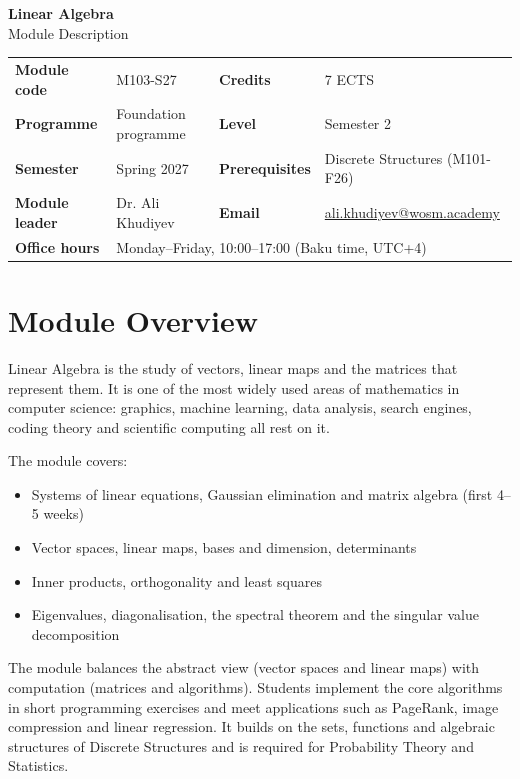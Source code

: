 \documentclass[11pt,a4paper]{article}
\makeatletter
\newcommand{\ModuleTitle}{Linear Algebra}
\newcommand{\ModuleCode}{M103-S27}
\newcommand{\Programme}{Foundation programme}
\newcommand{\Level}{Semester 2}
\newcommand{\Semester}{Spring 2027}
\newcommand{\Credits}{7 ECTS}
\newcommand{\ModuleLeader}{Dr. Ali Khudiyev}
\newcommand{\Email}{ali.khudiyev@wosm.academy}
\newcommand{\OfficeHours}{Monday--Friday, 10:00--17:00 (Baku time, UTC+4)}
\newcommand{\Prerequisites}{Discrete Structures (M101-F26)}
\makeatother
\begin{document}
\begin{center}
  {\LARGE\bfseries\color{accent} \ModuleTitle}\\[4pt]
  {\large Module Description}
\end{center}
\vspace{6pt}

\begin{tabularx}{\textwidth}{>{\bfseries}l X >{\bfseries}l X}
\toprule
Module code   & \ModuleCode    & Credits      & \Credits \\
Programme     & \Programme     & Level        & \Level \\
Semester      & \Semester      & Prerequisites & \Prerequisites \\
Module leader & \ModuleLeader  & Email        & \href{mailto:\Email}{\Email} \\
Office hours  & \multicolumn{3}{l}{\OfficeHours} \\
\bottomrule
\end{tabularx}

\section{Module Overview}
Linear Algebra is the study of vectors, linear maps and the matrices that
represent them. It is one of the most widely used areas of mathematics in computer
science: graphics, machine learning, data analysis, search engines, coding theory
and scientific computing all rest on it.

The module covers:
\begin{itemize}
  \item Systems of linear equations, Gaussian elimination and matrix algebra
        (first 4--5 weeks)
  \item Vector spaces, linear maps, bases and dimension, determinants
  \item Inner products, orthogonality and least squares
  \item Eigenvalues, diagonalisation, the spectral theorem and the singular value
        decomposition
\end{itemize}

The module balances the abstract view (vector spaces and linear maps) with
computation (matrices and algorithms). Students implement the core algorithms in
short programming exercises and meet applications such as PageRank, image
compression and linear regression. It builds on the sets, functions and algebraic
structures of Discrete Structures and is required for Probability Theory and
Statistics.
\end{document}
